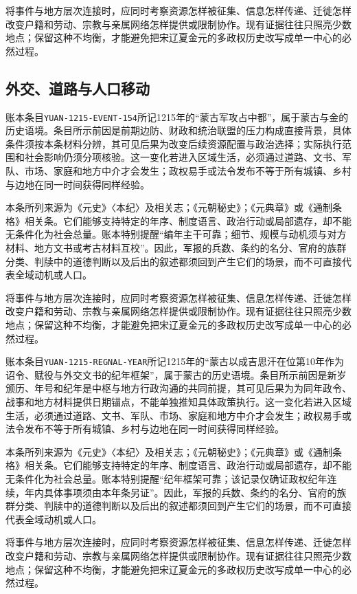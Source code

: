 将事件与地方层次连接时，应同时考察资源怎样被征集、信息怎样传递、迁徙怎样改变户籍和劳动、宗教与亲属网络怎样提供或限制协作。现有证据往往只照亮少数地点；保留这种不均衡，才能避免把宋辽夏金元的多政权历史改写成单一中心的必然过程。

\subsection{外交、道路与人口移动}

账本条目\texttt{YUAN-1215-EVENT-154}所记1215年的“蒙古军攻占中都”，属于蒙古与金的历史语境。条目所示前因是前期边防、财政和统治联盟的压力构成直接背景，具体条件须按本条材料分辨，其可见后果为改变后续资源配置与政治选择；实际执行范围和社会影响仍须分项核验。这一变化若进入区域生活，必须通过道路、文书、军队、市场、家庭和地方中介才会发生；政权易手或法令发布不等于所有城镇、乡村与边地在同一时间获得同样经验。

本条所列来源为《元史》〈本纪〉及相关志；《元朝秘史》；《元典章》或《通制条格》相关条。它们能够支持特定的年序、制度语言、政治行动或局部遗存，却不能无条件化为社会总量。账本特别提醒“编年主干可靠；细节、规模与动机须与对方材料、地方文书或考古材料互校”。因此，军报的兵数、条约的名分、官府的族群分类、判牍中的道德判断以及后出的叙述都须回到产生它们的场景，而不可直接代表全域动机或人口。

将事件与地方层次连接时，应同时考察资源怎样被征集、信息怎样传递、迁徙怎样改变户籍和劳动、宗教与亲属网络怎样提供或限制协作。现有证据往往只照亮少数地点；保留这种不均衡，才能避免把宋辽夏金元的多政权历史改写成单一中心的必然过程。

账本条目\texttt{YUAN-1215-REGNAL-YEAR}所记1215年的“蒙古以成吉思汗在位第10年作为诏令、赋役与外交文书的纪年框架”，属于蒙古的历史语境。条目所示前因是新岁颁历、年号和纪年是中枢与地方行政沟通的共同前提，其可见后果为为同年政令、战事和地方材料提供日期锚点，不能单独推知具体政策执行。这一变化若进入区域生活，必须通过道路、文书、军队、市场、家庭和地方中介才会发生；政权易手或法令发布不等于所有城镇、乡村与边地在同一时间获得同样经验。

本条所列来源为《元史》〈本纪〉及相关志；《元朝秘史》；《元典章》或《通制条格》相关条。它们能够支持特定的年序、制度语言、政治行动或局部遗存，却不能无条件化为社会总量。账本特别提醒“纪年框架可靠；该记录仅确证政权纪年连续，年内具体事项须由本年条另证”。因此，军报的兵数、条约的名分、官府的族群分类、判牍中的道德判断以及后出的叙述都须回到产生它们的场景，而不可直接代表全域动机或人口。

将事件与地方层次连接时，应同时考察资源怎样被征集、信息怎样传递、迁徙怎样改变户籍和劳动、宗教与亲属网络怎样提供或限制协作。现有证据往往只照亮少数地点；保留这种不均衡，才能避免把宋辽夏金元的多政权历史改写成单一中心的必然过程。

